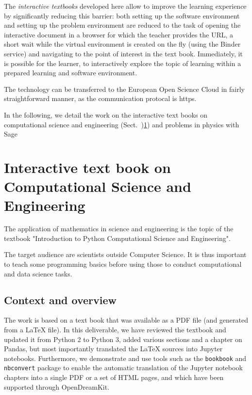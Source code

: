 \documentclass{deliverablereport}
\begin{document}
The \emph{interactive textbooks} developed here allow to improve the
learning experience by significantly reducing this barrier: both
setting up the software environment and setting up the problem
environment are reduced to the task of opening the interactive
document in a browser for which the teacher provides the URL, a short
wait while the virtual environment is created on the fly (using the
Binder service) and navigating to the point of interest in the text
book. Immediately, it is possible for the learner, to interactively
explore the topic of learning within a prepared learning and software
environment.

The technology can be transferred to the European Open Science Cloud
in fairly straightforward manner, as the communication protocal is https.

In the following, we detail the work on the interactive text books on
computational science and engineering (Sect.~)\ref{sec:computational-science-and-engineering})
and problems in physics with Sage 

\section{Interactive text book on Computational Science and Engineering}
\label{sec:computational-science-and-engineering}


The application of mathematics in science and engineering is the topic
of the textbook "Introduction to Python Computational Science and
Engineering".

The target audience are scientists outside Computer Science. It is
thus important to teach some programming basics before using those to
conduct computational and data science tasks.

\subsection{Context and overview}

The work is based on a text book that was available as a PDF file (and
generated from a \LaTeX{} file). In this deliverable, we have reviewed
the textbook and updated it from Python 2 to Python 3, added various
sections and a chapter on Pandas, but most importantly translated the
\LaTeX{} sources into Jupyter notebooks. Furthermore, we demonstrate and
use tools such as the \texttt{bookbook} and \texttt{nbconvert}
package to enable the automatic translation of the Jupyter notebook
chapters into a single PDF or a set of HTML pages, and which have been
supported through OpenDreamKit.
\end{document}

